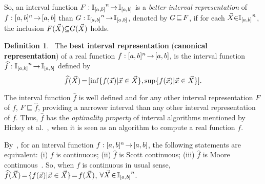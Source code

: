 \documentclass[12pt]{article}
\theoremstyle{plain}
\theoremstyle{remark}
\theoremstyle{definition}
\newtheorem{definition}[theorem]{Definition}
\theoremstyle{proposition}
\newcommand{\lra}{\hspace{-0.05cm}\rightarrow\hspace{-0.05cm}}
\begin{document}
So, an interval function $F:{\mathbb{I}_{[a,b]}}^n\lra \mathbb{I}_{[a,b]}$ is a \emph{better
interval representation} of $f:[a,b]^n\lra [a,b]$ than $G:{\mathbb{I}_{[a,b]}}^n\lra \mathbb{I}_{[a,b]}$, denoted by $G\hspace{-0.05cm}\sqsubseteq\hspace{-0.05cm}
F$, if for each $\vec{X}\hspace{-0.1cm}\in\hspace{-0.1cm}{\mathbb{I}_{[a,b]}}^n$, the inclusion $F(\vec{X})\hspace{-0.1cm}\subseteq\hspace{-0.1cm}G(\vec{X})$ holds.

\begin{definition}~\cite[Section 2]{SBA06}\label{d2}  The {\bf best interval representation} ({\bf canonical representation}) of a real function $f:[a,b]^n\lra [a,b]$, is the interval function
$\widehat{f}:{\mathbb{I}_{[a,b]}}^n\lra \mathbb{I}_{[a,b]}$ defined by\vspace{-0.2cm}
\begin{equation}\label{eq-br}\vspace{-0.1cm}
\widehat{f}(\vec{X})\hspace{-0.05cm}=\hspace{-0.05cm}[\inf \{f(\vec{x})|\vec{x} \in \vec{X}\}, \sup \{f(\vec{x})|\vec{x} \in \vec{X}\}].
\end{equation}
\end{definition}

The interval function $\widehat{f}$ is well defined and for any other interval representation $F$ of $f$, $F\sqsubseteq
\widehat{f}$, providing a narrower interval than any other interval representation of
$f$. Thus, $\widehat{f}$ has the \emph{optimality property} of interval algorithms mentioned by Hickey et
al.~\cite{Hic01}, when it is seen as an algorithm to compute a real function $f$.

By~\cite[Sect.~2.2]{SBA06}, for an interval function $f:[a,b]^n \lra [a,b]$, the following statements are equivalent: (i) $f$ is continuous; (ii) $\widehat{f}$ is Scott continuous; (iii)
$\widehat{f}$ is Moore continuous~\cite{SBA06}. So, when $f$ is continuous in usual sense,
$\widehat{f}(\vec{X})\hspace{-0.05cm}=\hspace{-0.05cm}\{f(\vec{x})|\vec{x}\in
\vec{X}\}\hspace{-0.05cm}=\hspace{-0.05cm}f(\vec{X})$, $\forall \vec{X}\hspace{-0.05cm}\in\hspace{-0.05cm}{\mathbb{I}_{[a,b]}}^n$.
\end{document}
